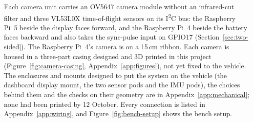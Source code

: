 Each camera unit carries an OV5647 camera module without an infrared-cut filter and three VL53L0X time-of-flight sensors on its I\textsuperscript{2}C bus: the Raspberry Pi~5 beside the display faces forward, and the Raspberry Pi~4 beside the battery faces backward and also takes the sync-pulse input on GPIO17 (Section~\ref{sec:two-sided}). The Raspberry Pi~4's camera is on a 15\,cm ribbon. Each camera is housed in a three-part casing designed and 3D printed in this project (Figure~\ref{fig:camera-casing}, Appendix~\ref{app:figures}), not yet fixed to the vehicle. The enclosures and mounts designed to put the system on the vehicle (the dashboard display mount, the two sensor pods and the IMU pods), the choices behind them and the checks on their geometry are in Appendix~\ref{app:mechanical}; none had been printed by 12 October. Every connection is listed in Appendix~\ref{app:wiring}, and Figure~\ref{fig:bench-setup} shows the bench setup.

